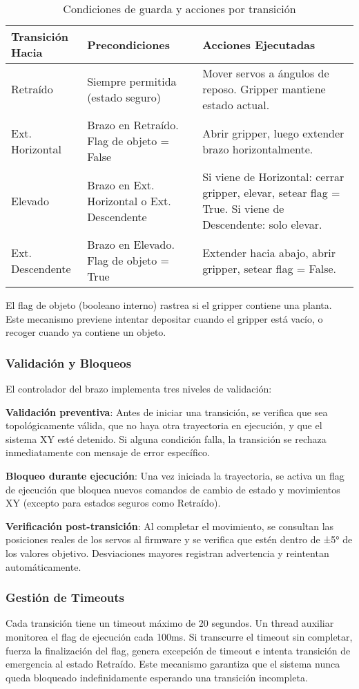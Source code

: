 \begin{table}[H]
\centering
\caption{Condiciones de guarda y acciones por transición}
\label{tab:condiciones_guarda}
\small
\begin{tabular}{|l|p{4cm}|p{6cm}|}
\hline
\textbf{Transición Hacia} & \textbf{Precondiciones} & \textbf{Acciones Ejecutadas} \\
\hline
Retraído & Siempre permitida (estado seguro) & Mover servos a ángulos de reposo. Gripper mantiene estado actual. \\
\hline
Ext. Horizontal & Brazo en Retraído. Flag de objeto = False & Abrir gripper, luego extender brazo horizontalmente. \\
\hline
Elevado & Brazo en Ext. Horizontal o Ext. Descendente & Si viene de Horizontal: cerrar gripper, elevar, setear flag = True. Si viene de Descendente: solo elevar. \\
\hline
Ext. Descendente & Brazo en Elevado. Flag de objeto = True & Extender hacia abajo, abrir gripper, setear flag = False. \\
\hline
\end{tabular}
\end{table}

El flag de objeto (booleano interno) rastrea si el gripper contiene una planta. Este mecanismo previene intentar depositar cuando el gripper está vacío, o recoger cuando ya contiene un objeto.

\subsubsection{Validación y Bloqueos}

El controlador del brazo implementa tres niveles de validación:

\textbf{Validación preventiva}: Antes de iniciar una transición, se verifica que sea topológicamente válida, que no haya otra trayectoria en ejecución, y que el sistema XY esté detenido. Si alguna condición falla, la transición se rechaza inmediatamente con mensaje de error específico.

\textbf{Bloqueo durante ejecución}: Una vez iniciada la trayectoria, se activa un flag de ejecución que bloquea nuevos comandos de cambio de estado y movimientos XY (excepto para estados seguros como Retraído).

\textbf{Verificación post-transición}: Al completar el movimiento, se consultan las posiciones reales de los servos al firmware y se verifica que estén dentro de ±5° de los valores objetivo. Desviaciones mayores registran advertencia y reintentan automáticamente.

\subsubsection{Gestión de Timeouts}

Cada transición tiene un timeout máximo de 20 segundos. Un thread auxiliar monitorea el flag de ejecución cada 100ms. Si transcurre el timeout sin completar, fuerza la finalización del flag, genera excepción de timeout e intenta transición de emergencia al estado Retraído. Este mecanismo garantiza que el sistema nunca queda bloqueado indefinidamente esperando una transición incompleta.
